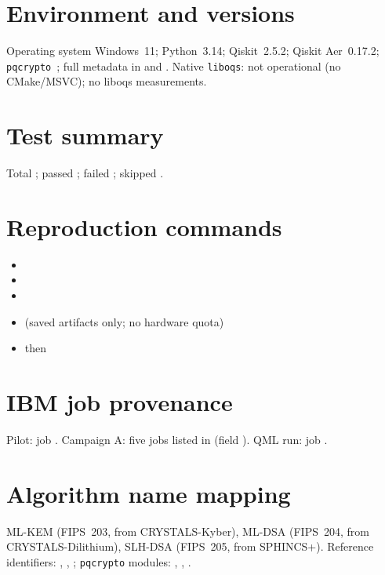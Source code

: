 \section*{Environment and versions}
Operating system Windows~11; Python~3.14; Qiskit~2.5.2; Qiskit Aer~0.17.2; \texttt{pqcrypto}~\PqcryptoVersion{}; full metadata in  and . Native \texttt{liboqs}: not operational (no CMake/MSVC); no liboqs measurements.

\section*{Test summary}
Total \TestsTotal{}; passed \TestsPassed{}; failed \TestsFailed{}; skipped \TestsSkipped{}.

\section*{Reproduction commands}
\begin{itemize}[noitemsep]
\item {}
\item {}
\item {}
\item {} (saved artifacts only; no hardware quota)
\item {} then 
\end{itemize}

\section*{IBM job provenance}
Pilot:  job \HwPilotJob{}. Campaign A: five jobs listed in  (field ). QML run:  job \HwFezJob{}.

\section*{Algorithm name mapping}
ML-KEM (FIPS~203, from CRYSTALS-Kyber), ML-DSA (FIPS~204, from CRYSTALS-Dilithium), SLH-DSA (FIPS~205, from SPHINCS+). Reference identifiers: , , ; \texttt{pqcrypto} modules: , , .

